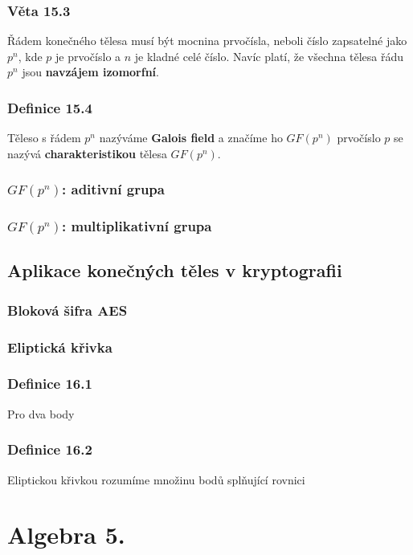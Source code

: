 \documentclass[12pt, letterpaper]{article}
\begin{document}
\subsubsection*{Věta 15.3}
Řádem konečného tělesa musí být mocnina prvočísla, neboli číslo zapsatelné jako $p^n$,
kde $p$ je prvočíslo a $n$ je kladné celé číslo.
Navíc platí, že všechna tělesa řádu $p^n$ jsou \textbf{navzájem izomorfní}.

\subsubsection*{Definice 15.4}
Těleso s řádem $p^n$ nazýváme \textbf{Galois field} a značíme ho $GF(p^n)$
prvočíslo $p$ se nazývá \textbf{charakteristikou} tělesa $GF(p^n)$.

\subsubsection*{$GF(p^n)$: aditivní grupa}

\subsubsection*{$GF(p^n)$: multiplikativní grupa}

\subsection{Aplikace konečných těles v kryptografii}

\subsubsection*{Bloková šifra AES}

\subsubsection*{Eliptická křivka}

\subsubsection*{Definice 16.1}
Pro dva body 

\subsubsection*{Definice 16.2}
Eliptickou křivkou rozumíme množinu bodů splňující rovnici

\section{Algebra 5.}
\end{document}
